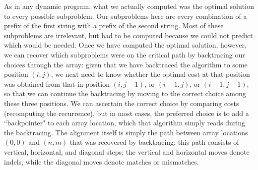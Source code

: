\documentclass[11pt]{article}
\begin{document}
As in any dynamic program, what we actually computed was the optimal solution
to every possible subproblem.  Our subproblems here are every combination of
a prefix of the first string with a prefix of the second string.  Most of these
subproblems are irrelevant, but had to be computed because we could not predict
which would be needed.   Once we have computed the optimal solution, however,
we can recover which subproblems were on the critical path by backtracing
our choices through the array: given that we have backtraced the algorithm to
some position $(i,j)$, we next need to know whether the optimal cost at
that position was obtained from that in position $(i,j-1)$, or $(i-1,j)$, or
$(i-1,j-1)$, so that we can continue the backtracing by moving to the correct
choice among these three positions.   We can ascertain the correct choice by
comparing costs (recomputing the recurrence), but in most cases, the preferred
choice is to add a ``backpointer" to each array location, which that algorithm
simply reads during the backtracing.  The alignment itself is simply
the path between array locations $(0,0)$ and $(n,m)$ that was recovered by
backtracing; this path consists of vertical, horizontal, and diagonal steps;
the vertical and horizontal moves denote indels, while the diagonal moves
denote matches or mismatches.
\end{document}
